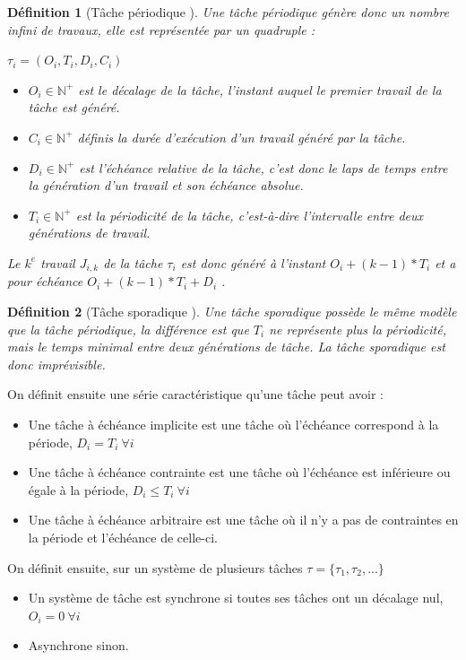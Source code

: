 \documentclass[a4paper]{report}
\theoremstyle{break}
\newtheorem{defin}{Définition}
\theoremstyle{breakplain}
\begin{document}
\begin{defin}[Tâche périodique \cite{goossens1999scheduling}]
Une tâche périodique génère donc un nombre infini de travaux, elle est représentée par un quadruple :
\begin{center}
$\tau_i = (O_i, T_i, D_i, C_i)$
\end{center}
\begin{itemize}
\item $O_i \in \mathbb{N}^{+}$ est le décalage de la tâche, l'instant auquel le premier travail de la tâche est généré.
\item $C_i \in \mathbb{N}^{+}$ définis la durée d'exécution d'un travail généré par la tâche.
\item $D_i \in \mathbb{N}^{+}$ est l'échéance relative de la tâche, c'est donc le laps de temps entre la génération d'un travail et son échéance absolue.
\item $T_i \in \mathbb{N}^{+}$ est la périodicité de la tâche, c'est-à-dire l'intervalle entre deux générations de travail.
\end{itemize}
Le $k^{e}$ travail $J_{i,k}$ de la tâche $\tau_i$ est donc généré à l'instant $O_i + (k-1)*T_i$ et a pour échéance  $O_i+(k-1)*T_i+D_i$ .
\end{defin}
\begin{defin}[Tâche sporadique \cite{goossens1999scheduling}]
Une tâche sporadique possède le même modèle que la tâche périodique, la différence est que $T_i$ ne représente plus la périodicité, mais le temps minimal entre deux générations de tâche. La tâche sporadique est donc imprévisible.
\end{defin}


On définit ensuite une série caractéristique \cite{goossens1999scheduling} qu'une tâche peut avoir :
\begin{itemize}
\item Une tâche à échéance implicite est une tâche où l'échéance correspond à la période, $D_i = T_i\ \forall i$
\item Une tâche à échéance contrainte est une tâche où l'échéance est inférieure ou égale à la période, $D_i \le T_i\ \forall i$
\item Une tâche à échéance arbitraire est une tâche où il n'y a pas de contraintes en la période et l'échéance de celle-ci.
\end{itemize}
On définit ensuite, sur un système de plusieurs tâches $\tau = \{\tau_1, \tau_2, ...\}$
\begin{itemize}
\item Un système de tâche est synchrone si toutes ses tâches ont un décalage nul, $O_i = 0\ \forall i$
\item Asynchrone sinon.
\end{itemize}
\end{document}
